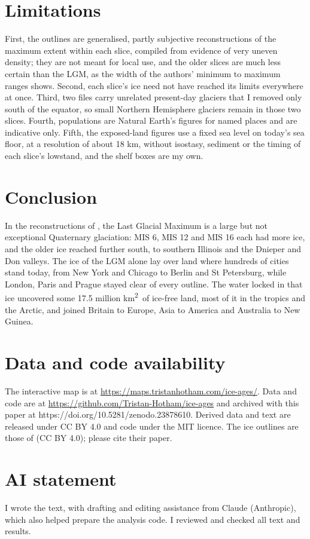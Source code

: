 \documentclass[11pt,a4paper]{article}
\newcommand{\kmq}{km\textsuperscript{2}}
\begin{document}
\section{Limitations}
First, the outlines are generalised, partly subjective reconstructions of the maximum extent within each slice, compiled from evidence of very uneven density; they are not meant for local use, and the older slices are much less certain than the LGM, as the width of the authors' minimum to maximum ranges shows. Second, each slice's ice need not have reached its limits everywhere at once. Third, two files carry unrelated present-day glaciers that I removed only south of the equator, so small Northern Hemisphere glaciers remain in those two slices. Fourth, populations are Natural Earth's figures for named places and are indicative only. Fifth, the exposed-land figures use a fixed sea level on today's sea floor, at a resolution of about 18 km, without isostasy, sediment or the timing of each slice's lowstand, and the shelf boxes are my own.

\section{Conclusion}
In the reconstructions of \citet{batchelor}, the Last Glacial Maximum is a large but not exceptional Quaternary glaciation: MIS 6, MIS 12 and MIS 16 each had more ice, and the older ice reached further south, to southern Illinois and the Dnieper and Don valleys. The ice of the LGM alone lay over land where hundreds of cities stand today, from New York and Chicago to Berlin and St Petersburg, while London, Paris and Prague stayed clear of every outline. The water locked in that ice uncovered some 17.5 million \kmq\ of ice-free land, most of it in the tropics and the Arctic, and joined Britain to Europe, Asia to America and Australia to New Guinea.

\section*{Data and code availability}
The interactive map is at \url{https://maps.tristanhotham.com/ice-ages/}. Data and code are at \url{https://github.com/Tristan-Hotham/ice-ages} and archived with this paper at https://doi.org/10.5281/zenodo.23878610. Derived data and text are released under CC BY 4.0 and code under the MIT licence. The ice outlines are those of \citet{batchelor} (CC BY 4.0); please cite their paper.

\section*{AI statement}
I wrote the text, with drafting and editing assistance from Claude (Anthropic), which also helped prepare the analysis code. I reviewed and checked all text and results.
\end{document}
